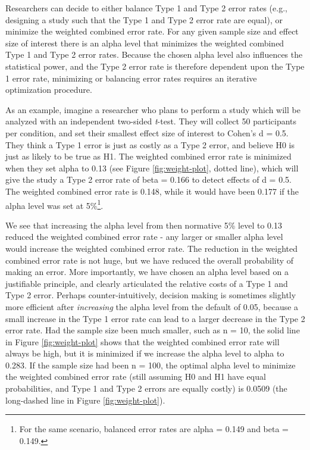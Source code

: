 \documentclass[
  english,
  ,man, a4paper,floatsintext]{apa6}
\begin{document}
Researchers can decide to either balance Type 1 and Type 2 error rates (e.g., designing a study such that the Type 1 and Type 2 error rate are equal), or minimize the weighted combined error rate. For any given sample size and effect size of interest there is an alpha level that minimizes the weighted combined Type 1 and Type 2 error rates. Because the chosen alpha level also influences the statistical power, and the Type 2 error rate is therefore dependent upon the Type 1 error rate, minimizing or balancing error rates requires an iterative optimization procedure.

As an example, imagine a researcher who plans to perform a study which will be analyzed with an independent two-sided \emph{t}-test. They will collect 50 participants per condition, and set their smallest effect size of interest to Cohen's d = 0.5. They think a Type 1 error is just as costly as a Type 2 error, and believe H0 is just as likely to be true as H1. The weighted combined error rate is minimized when they set alpha to 0.13 (see Figure \ref{fig:weight-plot}, dotted line), which will give the study a Type 2 error rate of beta = 0.166 to detect effects of d = 0.5. The weighted combined error rate is 0.148, while it would have been 0.177 if the alpha level was set at 5\%\footnote{For the same scenario, balanced error rates are alpha = 0.149 and beta = 0.149.}.

We see that increasing the alpha level from then normative 5\% level to 0.13 reduced the weighted combined error rate - any larger or smaller alpha level would increase the weighted combined error rate. The reduction in the weighted combined error rate is not huge, but we have reduced the overall probability of making an error. More importantly, we have chosen an alpha level based on a justifiable principle, and clearly articulated the relative costs of a Type 1 and Type 2 error. Perhaps counter-intuitively, decision making is sometimes slightly more efficient after \emph{increasing} the alpha level from the default of 0.05, because a small increase in the Type 1 error rate can lead to a larger decrease in the Type 2 error rate. Had the sample size been much smaller, such as n = 10, the solid line in Figure \ref{fig:weight-plot} shows that the weighted combined error rate will always be high, but it is minimized if we increase the alpha level to alpha to 0.283. If the sample size had been n = 100, the optimal alpha level to minimize the weighted combined error rate (still assuming H0 and H1 have equal probabilities, and Type 1 and Type 2 errors are equally costly) is 0.0509 (the long-dashed line in Figure \ref{fig:weight-plot}).
\end{document}
